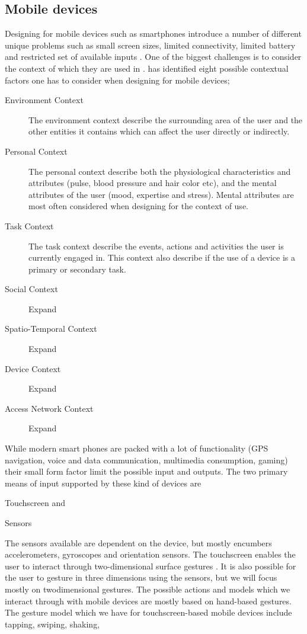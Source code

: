 \subsection{Mobile devices}
Designing for mobile devices such as smartphones introduce a number of different unique problems such as small screen sizes, limited connectivity, limited battery and restricted set of available inputs \cite{Zhang2005}. One of the biggest challenges is to consider the context of which they are used in \cite{Zhang2005} \cite{Harrison2013} \cite{Korhonen2010}. \cite{Korhonen2010} has identified eight possible contextual factors one has to consider when designing for mobile devices;
\begin{description}
  \item [Environment Context] The environment context describe the surrounding area of the user and the other entities it contains which can affect the user directly or indirectly.
  \item [Personal Context] The personal context describe both the physiological characteristics and attributes (pulse, blood pressure and hair color etc), and the mental attributes of the user (mood, expertise and stress). Mental attributes are most often considered when designing for the context of use.
  \item[Task Context] The task context describe the events, actions and activities the user is currently engaged in. This context also describe if the use of a device is a primary or secondary task.
  \item[Social Context] Expand
  \item[Spatio-Temporal Context] Expand
  \item[Device Context] Expand
  \item[Access Network Context] Expand
\end{description}
While modern smart phones are packed with a lot of functionality (GPS navigation, voice and data communication, multimedia consumption, gaming) their small form factor limit the possible input and outputs. The two primary means of input supported by these kind of devices are
\begin{enumerate*}
  \item Touchscreen and
  \item Sensors
\end{enumerate*}

The sensors available are dependent on the device, but mostly encumbers accelerometers, gyroscopes and orientation sensors. The touchscreen enables the user to interact through two-dimensional surface gestures \cite{Ruiz2011}. It is also possible for the user to gesture in three dimensions using the sensors, but we will focus mostly on twodimensional gestures. The possible actions and models which we interact through with mobile devices are mostly based on hand-based gestures. The gesture model which we have for touchscreen-based mobile devices include tapping, swiping, shaking,

